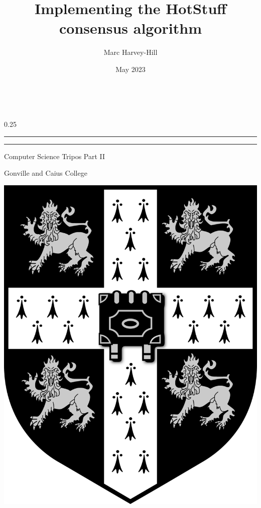 \documentclass[12pt]{report}
\title{Implementing the HotStuff consensus algorithm}
\author{Marc Harvey-Hill}
\date{May 2023}
\makeatletter
\renewcommand\maketitle{{
    {\hfill \LARGE  \@author} \\[4ex]
    
    \begin{raggedright}
    
        {\setlength{\parindent}{0pt} \fontsize{40}{20} \renewcommand{\baselinestretch}{2} \bfseries \@title \par}

        \vspace{4ex}

        \begin{spacing} {0.25}
            \noindent\rule{\linewidth}{0.4pt} 
            \noindent\rule{\linewidth}{0.4pt}
        \end{spacing}

        \vspace{4ex}
        
        \LARGE Computer Science Tripos Part II

        \LARGE Gonville and Caius College
        
        \LARGE \@date
        
    \end{raggedright}
        
}}
\makeatother
\begin{document}
\begin{titlepage}
    \maketitle

    \vfill

    \noindent\includegraphics[scale=0.1]{university.png}


\end{titlepage}
\end{document}

